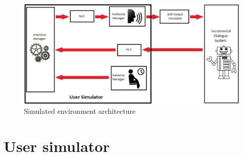 		\begin{figure}[htb]
			\centering
			\includegraphics[scale=0.45]{figures/SimuSys.jpg}
			\caption{Simulated environment architecture}
			\label{fig:simuoverview}
		\end{figure}
    
\section{User simulator}
				
        
				
